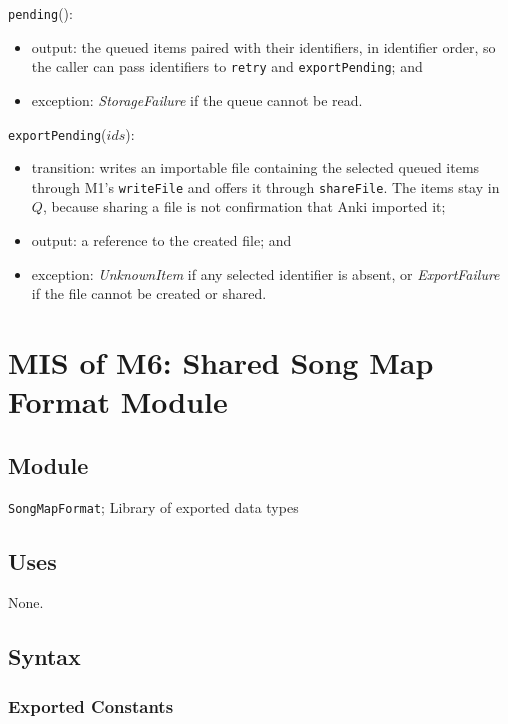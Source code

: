 \documentclass[12pt, titlepage]{article}
\begin{document}
\noindent \texttt{pending}():
\begin{itemize}
  \item output: the queued items paired with their identifiers, in
  identifier order, so the caller can pass identifiers to \texttt{retry}
  and \texttt{exportPending}; and
  \item exception: \textit{StorageFailure} if the queue cannot be read.
\end{itemize}

\noindent \texttt{exportPending}($ids$):
\begin{itemize}
  \item transition: writes an importable file containing the selected queued
  items through M1's \texttt{writeFile} and offers it through
  \texttt{shareFile}.  The items stay in $Q$, because sharing a file is not
  confirmation that Anki imported it;
  \item output: a reference to the created file; and
  \item exception: \textit{UnknownItem} if any selected identifier is absent,
  or \textit{ExportFailure} if the file cannot be created or shared.
\end{itemize}

\newpage

\section{MIS of M6: Shared Song Map Format Module} \label{mSongMapFormat}

\subsection{Module}

\texttt{SongMapFormat}; Library of exported data types

\subsection{Uses}

None.

\subsection{Syntax}

\subsubsection{Exported Constants}
\end{document}
